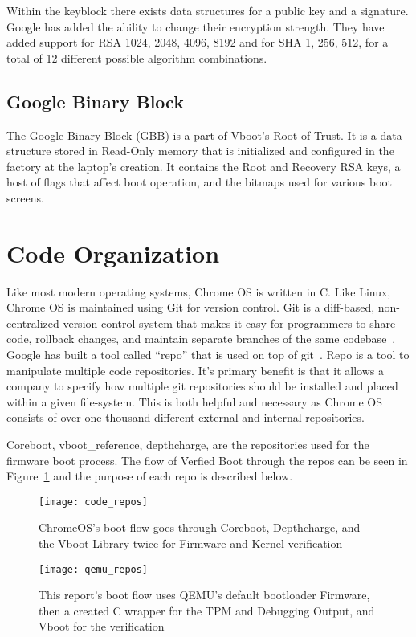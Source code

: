 Within the keyblock there exists data structures for a public key and a signature.
Google has added the ability to change their encryption strength.
They have added support for RSA 1024, 2048, 4096, 8192 and for SHA 1, 256, 512, for a total of 12 different possible algorithm combinations.

\subsection{Google Binary Block}

The Google Binary Block (GBB) is a part of Vboot's Root of Trust.
It is a data structure stored in Read-Only memory that is initialized and configured in the factory at the laptop's creation.
It contains the Root and Recovery RSA keys, a host of flags that affect boot operation, and the bitmaps used for various boot screens.


\section{Code Organization}

Like most modern operating systems, Chrome OS is written in C.
Like Linux, Chrome OS is maintained using Git for version control. 
Git is a diff-based, non-centralized version control system that makes it easy for programmers to share code, rollback changes, and maintain separate branches of the same codebase~\cite{git}.
Google has built a tool called ``repo'' that is used on top of git~\cite{repo}. 
Repo is a tool to manipulate multiple code repositories. 
It's primary benefit is that it allows a company to specify how multiple git repositories should be installed and placed within a given file-system.
This is both helpful and necessary as Chrome OS consists of over one thousand different external and internal repositories. 

Coreboot, vboot\_reference, depthcharge, are the repositories used for the firmware boot process.
The flow of Verfied Boot through the repos can be seen in
Figure~\ref{fig:code_repos} and the purpose of each repo is described below.

\begin{figure}
  \centering
  \texttt{[image: code\_repos]}
  \caption{ChromeOS's boot flow goes through Coreboot, Depthcharge, and the Vboot Library twice for Firmware and Kernel verification}\label{fig:code_repos}
\end{figure}
\begin{figure}
  \centering
  \texttt{[image: qemu\_repos]}
  \caption{This report's boot flow uses QEMU's default bootloader Firmware, then
  a created C wrapper for the TPM and Debugging Output, and Vboot for the
  verification}\label{fig:qemu_repos}
\end{figure}

